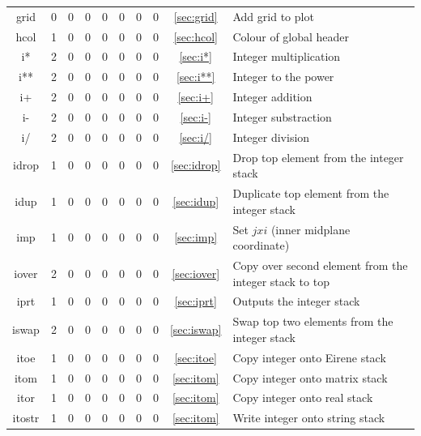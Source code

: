 \documentclass[a4paper,10pt]{report}
\begin{document}
\begin{center}
\begin{longtable}{|c|c|c|c|c|c|c|c|c|l|}
    grid \index{b2plot, grid}      & 0 & 0 & 0 & 0 & 0 & 0 & 0 & \ref{sec:grid}   & Add grid to plot \\
    hcol \index{b2plot, hcol}      & 1 & 0 & 0 & 0 & 0 & 0 & 0 & \ref{sec:hcol}   & Colour of global header \\
    i* \index{b2plot, i*}          & 2 & 0 & 0 & 0 & 0 & 0 & 0 & \ref{sec:i*}     & Integer multiplication \\
    i** \index{b2plot, i**}        & 2 & 0 & 0 & 0 & 0 & 0 & 0 & \ref{sec:i**}    & Integer to the power \\
    i+ \index{b2plot, i+}          & 2 & 0 & 0 & 0 & 0 & 0 & 0 & \ref{sec:i+}     & Integer addition \\
    i- \index{b2plot, i-}          & 2 & 0 & 0 & 0 & 0 & 0 & 0 & \ref{sec:i-}     & Integer substraction \\
    i/ \index{b2plot, i/}          & 2 & 0 & 0 & 0 & 0 & 0 & 0 & \ref{sec:i/}     & Integer division \\
    idrop \index{b2plot, idrop}    & 1 & 0 & 0 & 0 & 0 & 0 & 0 & \ref{sec:idrop}  & Drop top element from the integer stack \\
    idup \index{b2plot, idup}      & 1 & 0 & 0 & 0 & 0 & 0 & 0 & \ref{sec:idup}   & Duplicate top element from the integer stack \\
    imp \index{b2plot, imp}        & 1 & 0 & 0 & 0 & 0 & 0 & 0 & \ref{sec:imp}    & Set $jxi$ (inner midplane coordinate) \\
    iover \index{b2plot, iover}    & 2 & 0 & 0 & 0 & 0 & 0 & 0 & \ref{sec:iover}  & Copy over second element from the integer stack to top \\
    iprt \index{b2plot, iprt}      & 1 & 0 & 0 & 0 & 0 & 0 & 0 & \ref{sec:iprt}   & Outputs the integer stack \\
    iswap \index{b2plot, iswap}    & 2 & 0 & 0 & 0 & 0 & 0 & 0 & \ref{sec:iswap}  & Swap top two elements from the integer stack \\
    itoe \index{b2plot, itoe}      & 1 & 0 & 0 & 0 & 0 & 0 & 0 & \ref{sec:itoe}   & Copy integer onto Eirene stack \\
    itom \index{b2plot, itom}      & 1 & 0 & 0 & 0 & 0 & 0 & 0 & \ref{sec:itom}   & Copy integer onto matrix stack \\
    itor \index{b2plot, itor}      & 1 & 0 & 0 & 0 & 0 & 0 & 0 & \ref{sec:itom}   & Copy integer onto real stack \\
    itostr \index{b2plot, itostr}  & 1 & 0 & 0 & 0 & 0 & 0 & 0 & \ref{sec:itom}   & Write integer onto string stack \\

\end{longtable}
\end{center}
\end{document}
